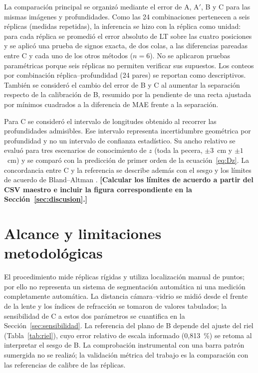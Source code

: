 \documentclass{report}
\newcommand{\Aprime}{A$'$}
\newcommand{\pend}[1]{\textbf{[#1]}}
\begin{document}
La comparación principal se organizó mediante el error de A, \Aprime, B y C para las mismas imágenes y profundidades. Como las 24 combinaciones pertenecen a seis réplicas (medidas repetidas), la inferencia se hizo con la réplica como unidad: para cada réplica se promedió el error absoluto de LT sobre las cuatro posiciones y se aplicó una prueba de signos exacta, de dos colas, a las diferencias pareadas entre C y cada uno de los otros métodos ($n = 6$). No se aplicaron pruebas paramétricas porque seis réplicas no permiten verificar sus supuestos. Los conteos por combinación réplica--profundidad (24 pares) se reportan como descriptivos. También se consideró el cambio del error de B y C al aumentar la separación respecto de la calibración de B, resumido por la pendiente de una recta ajustada por mínimos cuadrados a la diferencia de MAE frente a la separación.

Para C se consideró el intervalo de longitudes obtenido al recorrer las profundidades admisibles. Ese intervalo representa incertidumbre geométrica por profundidad y no un intervalo de confianza estadístico. Su ancho relativo se evaluó para tres escenarios de conocimiento de $z$ (toda la pecera, $\pm 3$~cm y $\pm 1$~cm) y se comparó con la predicción de primer orden de la ecuación~\eqref{eq:Dz}. La concordancia entre C y la referencia se describe además con el sesgo y los límites de acuerdo de Bland--Altman \parencite{Bland1986}. \pend{Calcular los límites de acuerdo a partir del CSV maestro e incluir la figura correspondiente en la Sección~\ref{sec:discusion}.}

\section{Alcance y limitaciones metodológicas}
\label{sec:limitaciones-metod}

El procedimiento mide réplicas rígidas y utiliza localización manual de puntos; por ello no representa un sistema de segmentación automática ni una medición completamente automática. La distancia cámara--vidrio se midió desde el frente de la lente y los índices de refracción se tomaron de valores tabulados; la sensibilidad de C a estos dos parámetros se cuantifica en la Sección~\ref{sec:sensibilidad}. La referencia del plano de B depende del ajuste del riel (Tabla~\ref{tab:riel}), cuyo error relativo de escala informado (0,813~\%) se retoma al interpretar el sesgo de B. La comprobación instrumental con una barra patrón sumergida no se realizó; la validación métrica del trabajo es la comparación con las referencias de calibre de las réplicas.
\end{document}
